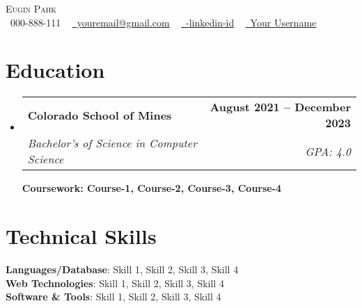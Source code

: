 \documentclass[letterpaper,11pt]{article}
\makeatletter
\newcommand{\resumeSubheading}[4]{
  \vspace{-2pt}\item
    \begin{tabular*}{1.0\textwidth}[t]{l@{\extracolsep{\fill}}r}
      \textbf{#1} & \textbf{\small #2} \\
      \textit{\small#3} & \textit{\small #4} \\
    \end{tabular*}\vspace{-7pt}
}
\newcommand{\resumeSubHeadingListStart}{\begin{itemize}[leftmargin=0.0in, label={}]}
\newcommand{\resumeSubHeadingListEnd}{\end{itemize}}
\makeatother
\begin{document}
\begin{center}
    {\Huge \scshape Eugin Pahk} \\ \vspace{1pt}
    \small
    \raisebox{-0.1\height}\faPhone\ 000-888-111 ~
    \href{mailto:youremail@gmail.com}{\faEnvelope\ youremail@gmail.com} ~ 
    \href{https://linkedin.com/in/}{\faLinkedin\ -linkedin-id}  ~
    \href{https://github.com/}{\faGithub\ Your Username}
    \vspace{-8pt}
\end{center}




\section{Education}
  \resumeSubHeadingListStart
    \resumeSubheading
      {Colorado School of Mines}{August 2021 -- December 2023}
      {Bachelor's of Science in Computer Science }{GPA: 4.0}
      
      \small{\textbf{Coursework: Course-1, Course-2, Course-3, Course-4}}
      \resumeSubHeadingListEnd

\vspace{-18pt}

\section{Technical Skills}
 \begin{itemize}[leftmargin=0.1in, label={}]
    \small{\item{
     \textbf{Languages/Database}{: Skill 1, Skill 2, Skill 3, Skill 4} \\
     \textbf{Web Technologies}{: Skill 1, Skill 2, Skill 3, Skill 4} \\
     \textbf{Software \& Tools}{: Skill 1, Skill 2, Skill 3, Skill 4}\\
     
    }}
 \end{itemize}
 \vspace{-20pt}
\end{document}
